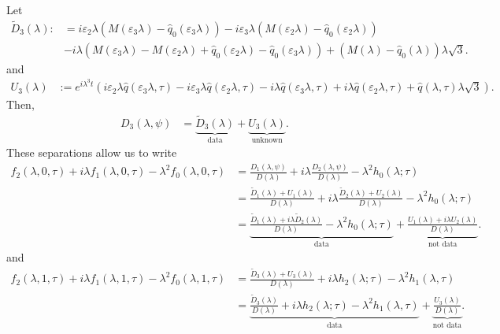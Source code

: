 Let 
\begin{align*}
    \widetilde{D}_3(\lambda) :&= i \varepsilon_2\lambda (M(\varepsilon_3\lambda) - \widehat{q}_0(\varepsilon_3\lambda))-i \varepsilon_3\lambda( M(\varepsilon_2\lambda)- \widehat{q}_0(\varepsilon_2\lambda)) \\
    &- i\lambda(M(\varepsilon_3\lambda)   - M(\varepsilon_2\lambda) + \widehat{q}_0(\varepsilon_2\lambda) - \widehat{q}_0(\varepsilon_3\lambda)) + (M(\lambda) - \widehat{q}_0(\lambda)) \lambda \sqrt{3}.
\end{align*}
and 
\begin{align*}
    U_3(\lambda) &:= e^{i \lambda^3 t} (i \varepsilon_2\lambda \widehat{q}(\varepsilon_3\lambda,\tau)  -i \varepsilon_3\lambda\widehat{q}(\varepsilon_2\lambda,\tau) - i\lambda\widehat{q}(\varepsilon_3\lambda,\tau) + i\lambda\widehat{q}(\varepsilon_2\lambda,\tau) + \widehat{q}(\lambda,\tau)\lambda \sqrt{3}).
\end{align*}
Then,
\begin{align*}
    D_3(\lambda,\psi) &= \underbrace{\widetilde{D}_3(\lambda)}_\text{data} + \underbrace{U_3(\lambda)}_\text{unknown}.
\end{align*}
These separations allow us to write 
\begin{align*}
    f_2(\lambda, 0, \tau) + i \lambda f_1(\lambda, 0, \tau) - \lambda^2 f_0(\lambda, 0, \tau) &= \frac{D_1(\lambda, \psi)}{D(\lambda)} + i \lambda \frac{D_2(\lambda, \psi)}{D(\lambda)} - \lambda^2 h_0(\lambda; \tau)\\
    &= \frac{\widetilde{D}_1(\lambda) + U_1(\lambda)}{D(\lambda)} + i \lambda \frac{\widetilde{D}_2(\lambda) + U_2(\lambda)}{D(\lambda)} - \lambda^2 h_0(\lambda; \tau)\\
    &= \underbrace{\frac{\widetilde{D}_1(\lambda)+i \lambda\widetilde{D}_2(\lambda)}{D(\lambda)} - \lambda^2 h_0(\lambda; \tau)}_\text{data} + \underbrace{\frac{U_1(\lambda) + i \lambda  U_2(\lambda)}{D(\lambda)}}_\text{not data}.
\end{align*}
and
\begin{align*}
    f_2(\lambda, 1, \tau) + i \lambda f_1(\lambda, 1, \tau) - \lambda^2 f_0(\lambda, 1, \tau) &= \frac{\widetilde{D}_3(\lambda) + U_3(\lambda)}{D(\lambda)} + i \lambda h_2(\lambda; \tau) - \lambda^2 h_1(\lambda, \tau) \\
    &=\underbrace{\frac{\widetilde{D}_3(\lambda)}{D(\lambda)} + i \lambda h_2(\lambda; \tau) - \lambda^2 h_1(\lambda, \tau)}_\text{data} + \underbrace{\frac{U_3(\lambda)}{D(\lambda)}}_\text{not data}.
\end{align*}
